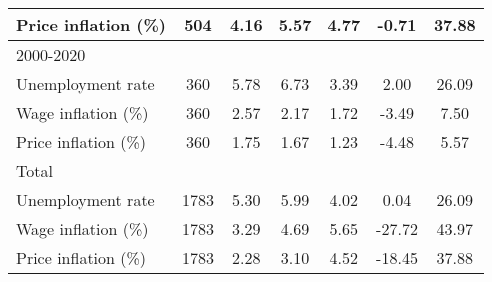 \begin{table}[htbp]
\begin{tabular}{l*{1}{cccccc}}
Price inflation (\%)&         504&        4.16&        5.57&        4.77&       -0.71&       37.88\\
\hline
2000-2020           &            &            &            &            &            &            \\
Unemployment rate   &         360&        5.78&        6.73&        3.39&        2.00&       26.09\\
Wage inflation (\%) &         360&        2.57&        2.17&        1.72&       -3.49&        7.50\\
Price inflation (\%)&         360&        1.75&        1.67&        1.23&       -4.48&        5.57\\
\hline
Total               &            &            &            &            &            &            \\
Unemployment rate   &        1783&        5.30&        5.99&        4.02&        0.04&       26.09\\
Wage inflation (\%) &        1783&        3.29&        4.69&        5.65&      -27.72&       43.97\\
Price inflation (\%)&        1783&        2.28&        3.10&        4.52&      -18.45&       37.88\\
\hline\hline
\end{tabular}
\end{table}

